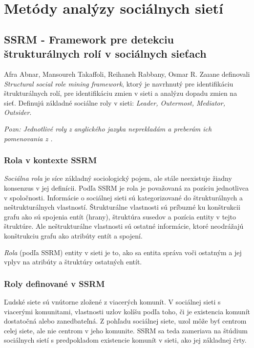 \documentclass[slovak,master,public,dept460,male,cpdeclaration,oneside]{diploma}
\begin{document}
\section{Metódy analýzy sociálnych sietí}

\subsection{SSRM - Framework pre detekciu štrukturálnych rolí v sociálnych sieťach}

Afra Abnar, Mansoureh Takaffoli, Reihaneh Rabbany, Osmar R. Zaıane \cite{9} definovali \textit{Structural social role mining framework}, ktorý je navrhnutý pre identifikáciu štrukturálnych rolí, pre identifikáciu zmien v sieti a analýzu dopadu zmien na sieť. Definujú základné sociálne roly v sieti: \textit{Leader, Outermost, Mediator, Outsider}. 


\noindent \textit{Pozn: Jednotlivé roly z anglického jazyka neprekladám a preberám ich pomenovania z  \cite{9}.}

\subsubsection{Rola v kontexte SSRM}
\textit{Sociálna rola} je síce základný sociologický pojem, ale stále neexistuje žiadny konsenzus v jej definícii. Podľa SSRM je rola je považovaná za pozíciu jednotlivca v spoločnosti.
 Informácie o sociálnej sieti sú kategorizované do štrukturálnych a neštrukturálnych vlastností. Štrukturálne vlastnosti sú príbuzné ku konštrukcii grafu ako sú spojenia entít (hrany), štruktúra susedov a pozícia entity v tejto štruktúre. Ale neštrukturálne vlastnosti sú ostatné informácie, ktoré neodrážajú konštrukciu grafu ako atribúty entít a spojení. 

\begin{definition} 
 \textit{Rola} (podľa SSRM) entity v sieti je to, ako sa entita správa voči ostatným a jej vplyv na atribúty a štruktúry ostatných entít.
\end{definition}

\subsubsection{Roly definované v SSRM}
Ľudské siete sú vnútorne zložené z viacerých komunít. V sociálnej sieti s viacerými komunitami, vlastnosti uzlov kolíšu podľa toho, či je existencia komunít dostatočná alebo zanedbateľná. Z pohľadu sociálnej siete, uzol môže byť centrom celej siete, ale nie centrom v jeho komunite. SSRM sa teda zameriava na štúdium sociálnych sietí s predpokladom existencie komunít v sieti, ako jej základnej črty.
\end{document}
